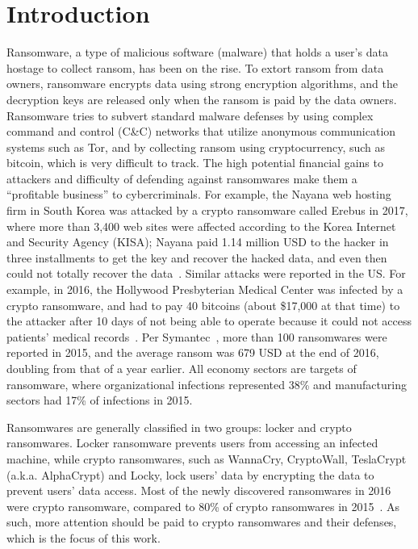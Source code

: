 \documentclass[conference]{IEEEtran}
\begin{document}
%


\section{Introduction}

Ransomware, a type of malicious software (malware) that holds a user's data hostage to
collect ransom, has been on the rise.  To extort ransom from data owners, ransomware encrypts data
using strong encryption algorithms, and the decryption keys are
released only when the ransom is paid by the data owners.  Ransomware tries to subvert standard malware defenses by using  complex command and control (C\&C) networks that utilize anonymous communication systems such as Tor, and by collecting ransom using cryptocurrency, such
as bitcoin, which is very difficult to track.
The high potential financial gains to attackers and difficulty of defending against ransomwares make them  a ``profitable business'' to cybercriminals.  For example, the Nayana web hosting firm in South Korea was attacked by a crypto ransomware called Erebus in
2017, where more than 3,400 web
sites were affected according to the Korea Internet and Security
Agency (KISA); Nayana paid 1.14 million USD to the hacker in three
installments to get the key and recover the hacked data, and even then could not totally recover the data~\cite{zdnet}.  Similar attacks were reported in the US. For example, in 2016, the Hollywood Presbyterian Medical Center was
infected by a crypto ransomware, and had to pay 40 bitcoins (about
\$17,000 at that time) to the attacker after 10 days of not being able to
operate because it could not access patients’ medical
records~\cite{everette16}.  Per Symantec~\cite{symantec16}, more than 100 ransomwares were reported in 2015, and the average ransom was 679 USD at the end of
2016, doubling from that of a year earlier.  All economy sectors are targets of ransomware, where organizational infections represented  38\% and manufacturing
sectors had 17\% of infections in 2015.

Ransomwares are generally classified in two groups: locker and
crypto ransomwares.  Locker ransomware prevents users from
accessing an infected machine, while crypto ransomwares, such as
WannaCry, CryptoWall, TeslaCrypt (a.k.a. AlphaCrypt) and Locky, lock
users' data by encrypting the data to prevent users' data access. 
Most of the newly discovered ransomwares in 2016 were crypto ransomware, compared to 80\% of crypto
ransomwares in 2015~\cite{symantec16}.  As such, more attention should be paid to crypto ransomwares and their defenses, which is the focus of this work.
\end{document}
